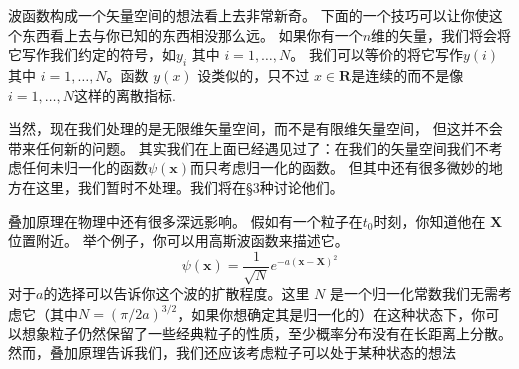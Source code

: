 波函数构成一个矢量空间的想法看上去非常新奇。 下面的一个技巧可以让你使这个东西看上去与你已知的东西相没那么远。 如果你有一个$n$维的矢量，我们将会将它写作我们约定的符号，如$y_i$ 其中 $i = 1,\dots,N$。 我们可以等价的将它写作$y(i)$ 其中 $i = 1,\dots,N$。函数 $y(x)$ 设类似的，只不过 $x \in \mathbf{R}$是连续的而不是像$i = 1,\dots,N$这样的离散指标.\par
当然，现在我们处理的是无限维矢量空间，而不是有限维矢量空间， 但这并不会带来任何新的问题。 其实我们在上面已经遇见过了：在我们的矢量空间我们不考虑任何未归一化的函数$\psi(\mathbf{x})$而只考虑归一化的函数。 但其中还有很多微妙的地方在这里，我们暂时不处理。我们将在\S 3种讨论他们。\par
叠加原理在物理中还有很多深远影响。 假如有一个粒子在$t_0$时刻，你知道他在 $\mathbf{X}$位置附近。 举个例子，你可以用高斯波函数来描述它。
\[
    \psi(\mathbf{x})=\dfrac{1}{\sqrt{N}}e^{-a(\mathbf{x}-\mathbf{X})^2}
\]
对于$a$的选择可以告诉你这个波的扩散程度。这里 $N$ 是一个归一化常数我们无需考虑它（其中$N = (\pi/2a)^{3/2}$，如果你想确定其是归一化的）在这种状态下，你可以想象粒子仍然保留了一些经典粒子的性质，至少概率分布没有在长距离上分散。然而，叠加原理告诉我们，我们还应该考虑粒子可以处于某种状态的想法
